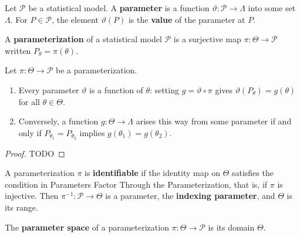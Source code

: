 \documentclass{article}
\begin{document}
\begin{definition}[Parameter]
        Let $\mathcal{P}$ be a \@{statistical model}. A \textbf{parameter} is a function
        $\vartheta : \mathcal{P} \to \Lambda$ into some set $\Lambda$. For $P \in \mathcal{P}$,
        the element $\vartheta(P)$ is the \textbf{value} of the parameter at $P$.
\end{definition}

\begin{definition}[Parameterization]
	A \textbf{parameterization} of a \@{statistical model} $\mathcal{P}$ is a \@{surjective} \@{map}
        $\pi : \Theta \to \mathcal{P}$ written $P_\theta = \pi(\theta)$.
\end{definition}

\begin{proposition}
        Let $\pi : \Theta \to \mathcal{P}$ be a \@{parameterization}.
        \begin{enumerate}
                \item Every \@{parameter} $\vartheta$ is a function of $\theta$: setting
                $g = \vartheta \circ \pi$ gives $\vartheta(P_\theta) = g(\theta)$ for all $\theta \in \Theta$.
                \item Conversely, a function $g : \Theta \to \Lambda$ arises this way from some
                \@{parameter} if and only if $P_{\theta_1} = P_{\theta_2}$ implies
                $g(\theta_1) = g(\theta_2)$.
        \end{enumerate}
\end{proposition}
\begin{proof}
	TODO
\end{proof}

\begin{definition}[Identifiable]
	A \@{parameterization} $\pi$ is \textbf{identifiable} if the \@{identity map} on $\Theta$
	satisfies the condition in \@{Parameters Factor Through the Parameterization}, that is, if $\pi$ is \@{injective}. Then
        $\pi^{-1} : \mathcal{P} \to \Theta$ is a \@{parameter}, the \textbf{indexing parameter},
	and $\Theta$ is its \@{range}.
\end{definition}

\begin{definition}
	The \textbf{parameter space} of a \@{parameterization} $\pi : \Theta \to \mathcal{P}$ is its \@{domain} $\Theta.$ 
\end{definition}
\end{document}
